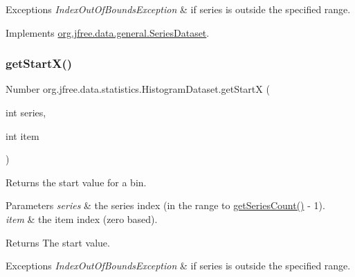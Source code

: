 \begin{DoxyExceptions}{Exceptions}
{\em Index\+Out\+Of\+Bounds\+Exception} & if {\ttfamily series} is outside the specified range. \\
\hline
\end{DoxyExceptions}


Implements \mbox{\hyperlink{interfaceorg_1_1jfree_1_1data_1_1general_1_1_series_dataset_a60488892b2314a05a012999e26a74178}{org.\+jfree.\+data.\+general.\+Series\+Dataset}}.

\mbox{\label{classorg_1_1jfree_1_1data_1_1statistics_1_1_histogram_dataset_aeac47110575d30da4a60153d8842a6da}} 
\subsubsection{\texorpdfstring{get\+Start\+X()}{getStartX()}}
{\footnotesize\ttfamily Number org.\+jfree.\+data.\+statistics.\+Histogram\+Dataset.\+get\+StartX (\begin{DoxyParamCaption}\item[{int}]{series,  }\item[{int}]{item }\end{DoxyParamCaption})}

Returns the start value for a bin.


\begin{DoxyParams}{Parameters}
{\em series} & the series index (in the range {} to {\ttfamily \mbox{\hyperlink{classorg_1_1jfree_1_1data_1_1statistics_1_1_histogram_dataset_a6dd14ceca0cb3f9b3d666a2aec480f8d}{get\+Series\+Count()}} -\/ 1}). \\
\hline
{\em item} & the item index (zero based).\\
\hline
\end{DoxyParams}
\begin{DoxyReturn}{Returns}
The start value.
\end{DoxyReturn}

\begin{DoxyExceptions}{Exceptions}
{\em Index\+Out\+Of\+Bounds\+Exception} & if {\ttfamily series} is outside the specified range. \\
\hline
\end{DoxyExceptions}


